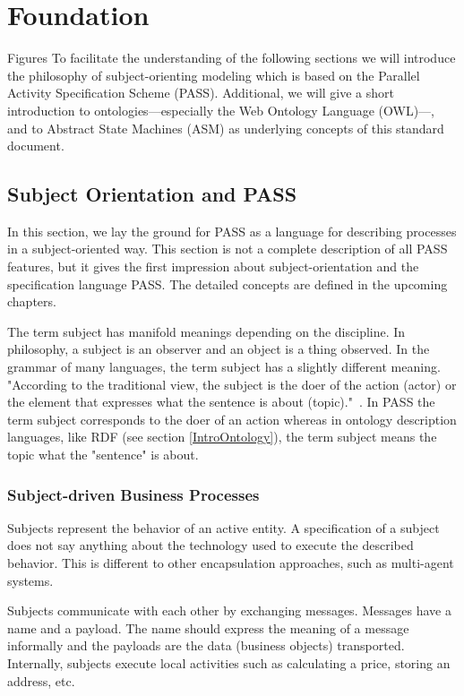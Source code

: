 
\chapter{Foundation}
Figures
To facilitate the understanding of the following sections we will introduce the philosophy of subject-orienting modeling which is based on the Parallel Activity Specification Scheme (PASS). Additional, we will give a short introduction to ontologies---especially the Web Ontology Language (OWL)---, and to Abstract State Machines (ASM) as underlying concepts of this standard document.

\section{Subject Orientation and PASS }
\label{SubjectOrient}


In this section, we lay the ground for PASS as a language for describing processes in a subject-oriented way. This section is not a complete description of all PASS features, but it gives the first impression about subject-orientation and the specification language PASS. The detailed concepts are defined in the upcoming chapters.

The term subject has manifold meanings depending on the discipline. In philosophy, a subject is an observer and an object is a thing observed. In the grammar of many languages, the term subject has a slightly different meaning. "According to the traditional view, the subject is the doer of the action (actor) or the element that expresses what the sentence is about (topic)."~\cite{Keenan:1976aa}. In PASS the term subject corresponds to the doer of an action whereas in ontology description languages, like RDF (see section \ref{IntroOntology}), the term subject means the topic what the "sentence" is about.

\subsection{Subject-driven Business Processes}

Subjects represent the behavior of an active entity. A specification of a subject does not say anything about the technology used to execute the described behavior. This is different to other encapsulation approaches, such as multi-agent systems.

Subjects communicate with each other by exchanging messages. Messages have a name and a payload. The name should express the meaning of a message informally and the payloads are the data (business objects) transported. Internally, subjects execute local activities such as calculating a price, storing an address, etc.


